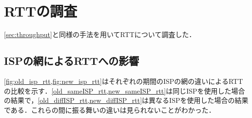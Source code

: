 \section{RTTの調査}
\label{sec:rtt}
\cref{sec:throughput}と同様の手法を用いてRTTについて調査した．
\subsection{ISPの網によるRTTへの影響}
\cref{fig:old_isp_rtt,fig:new_isp_rtt}はそれぞれの期間のISPの網の違いによるRTTの比較を示す．\cref{old_sameISP_rtt,new_sameISP_rtt}は同じISPを使用した場合の結果で，\cref{old_diffISP_rtt,new_diffISP_rtt}は異なるISPを使用した場合の結果である．これらの間に振る舞いの違いは見られないことがわかった．

